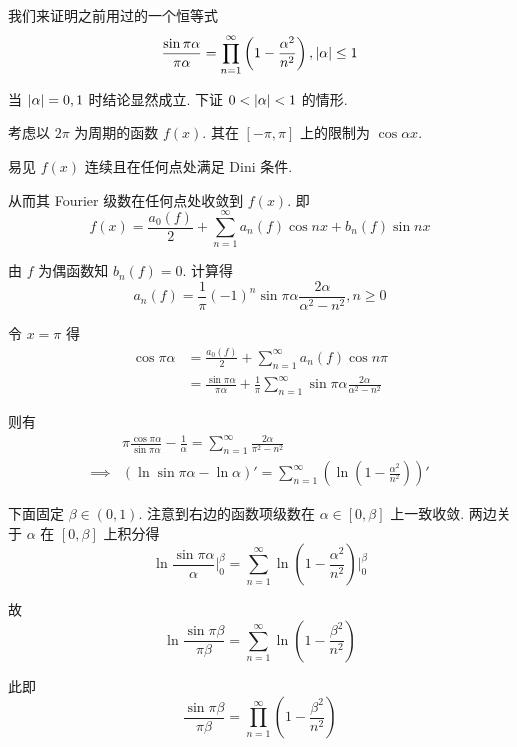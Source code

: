 \begin{example}
    我们来证明之前用过的一个恒等式
$$
\frac{\sin\pi\alpha}{\pi\alpha}=\prod_{n=1}^\infty\left(1-\frac{\alpha^2}{n^2}\right),\left\lvert{\alpha}\right\rvert\le 1
$$

    当 $\left\lvert{\alpha}\right\rvert=0,1$ 时结论显然成立. 下证 $0<\left\lvert{\alpha}\right\rvert<1$ 的情形.

    考虑以 $2\pi$ 为周期的函数 $f(x)$. 其在 $[-\pi,\pi]$ 上的限制为 $\cos\alpha x$.

    \begin{center}
    \end{center}

    易见 $f(x)$ 连续且在任何点处满足 Dini 条件.

    从而其 Fourier 级数在任何点处收敛到 $f(x)$. 即
$$
f(x)=\frac{a_0(f)}{2}+\sum_{n=1}^\infty a_n(f)\cos nx+b_n(f)\sin nx
$$

    由 $f$ 为偶函数知 $b_n(f)=0$. 计算得
$$
a_n(f)=\frac{1}{\pi}(-1)^n\sin\pi\alpha\frac{2\alpha}{\alpha^2-n^2},n\ge 0
$$

    令 $x=\pi$ 得
$$
\begin{aligned}
    \cos\pi\alpha&=\frac{a_0(f)}{2}+\sum_{n=1}^\infty a_n(f)\cos n\pi\\
    &=\frac{\sin\pi\alpha}{\pi\alpha}+\frac{1}{\pi}\sum_{n=1}^\infty\sin\pi\alpha\frac{2\alpha}{\alpha^2-n^2}
\end{aligned}
$$

    则有
$$
\begin{aligned}
    &\pi\frac{\cos\pi\alpha}{\sin\pi\alpha}-\frac{1}{\alpha}=\sum_{n=1}^\infty\frac{2\alpha}{\pi^2-n^2}\\
    \implies&(\ln\sin\pi\alpha-\ln\alpha)'=\sum_{n=1}^\infty\left(\ln\left(1-\frac{\alpha^2}{n^2}\right)\right)'
\end{aligned}
$$

    下面固定 $\beta\in(0,1)$. 注意到右边的函数项级数在 $\alpha\in[0,\beta]$ 上一致收敛. 两边关于 $\alpha$ 在 $[0,\beta]$ 上积分得
$$
\ln\frac{\sin\pi\alpha}{\alpha}\Bigg|_0^\beta=\sum_{n=1}^\infty\ln\left(1-\frac{\alpha^2}{n^2}\right)\Bigg|_0^\beta
$$

    故
$$
\ln\frac{\sin\pi\beta}{\pi\beta}=\sum_{n=1}^\infty\ln\left(1-\frac{\beta^2}{n^2}\right)
$$

    此即
$$
\frac{\sin\pi\beta}{\pi\beta}=\prod_{n=1}^\infty\left(1-\frac{\beta^2}{n^2}\right)
$$
\end{example}